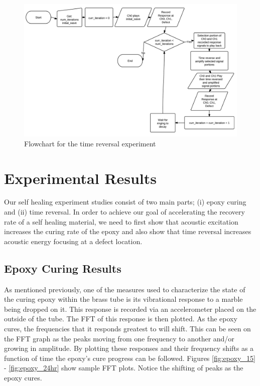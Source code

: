 \documentclass[]{aiaa-tc}%
\begin{document}
\begin{figure}[H]%
 \includegraphics{new_flow_chart}
 \centering
 \caption{Flowchart for the time reversal experiment}
 \label{fig:tr_flowchart}
\end{figure}



\section{Experimental Results}
Our self healing experiment studies consist of two main parts; (i) epoxy curing and (ii) time reversal. In order to achieve our goal of accelerating the recovery rate of a self healing material, we need to first show that acoustic excitation increases the curing rate of the epoxy and also show that time reversal increases acoustic energy focusing at a defect location. 

\subsection{Epoxy Curing Results}

As mentioned previously, one of the measures used to characterize the state of the curing epoxy within the brass tube is its vibrational response to a marble being dropped on it. This response is recorded via an accelerometer placed on the outside of the tube. The FFT of this response is then plotted. As the epoxy cures, the frequencies that it responds greatest to will shift. This can be seen on the FFT graph as the peaks moving from one frequency to another and/or growing in amplitude. By plotting these responses and their frequency shifts as a function of time the epoxy’s cure progress can be followed. Figures \ref{fig:epoxy_15} - \ref{fig:epoxy_24hr} show sample FFT plots. Notice the shifting of peaks as the epoxy cures.
\end{document}
